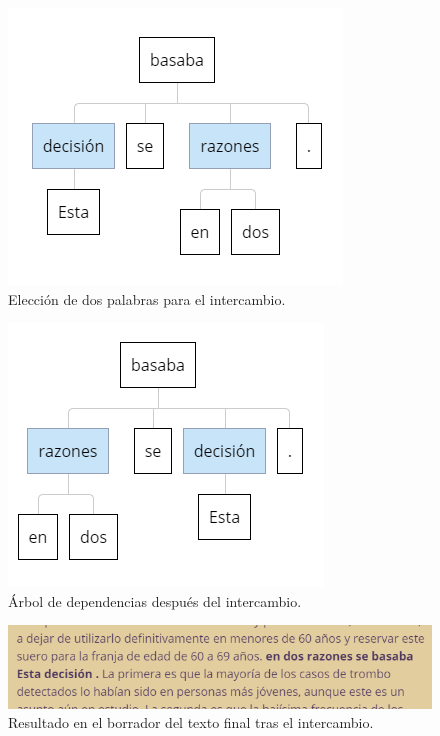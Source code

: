 \begin{figure}[h!]
	\centering
	
	
	\includegraphics[scale=1]{Imagenes/Figuras/EleccionIntercambio}
	
	
	\caption{Elección de dos palabras para el intercambio.}
	\label{fig:eleccionIntercambio}
\end{figure}
\begin{figure}[h!]
	\centering
	
	
	\includegraphics[scale=1]{Imagenes/Figuras/IntercambioArbol}
	
	
	\caption{Árbol de dependencias después del intercambio.}
	\label{fig:intercambio}
\end{figure}
\begin{figure}[h!]
	\centering
	
	
	\includegraphics[scale=1]{Imagenes/Figuras/BorradorIntercambio}
	
	
	\caption{Resultado en el borrador del texto final tras el intercambio.}
	\label{fig:borradorIntercambio}
\end{figure}
